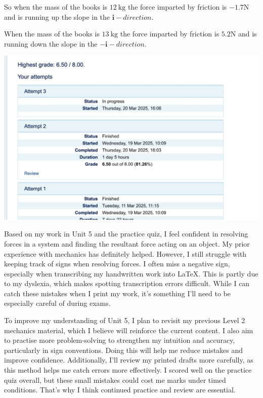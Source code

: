\documentclass{tufte-handout}
\begin{document}
\begin{question}
So when the mass of the books is \( \SI{12}{\kilo\gram} \) the force imparted by friction is 
\( -1.7\si{\newton} \) and is running up the slope in the \( \mathbf{i}-direction \).

When the mass of the books is \( \SI{13}{\kilo\gram} \) the force imparted by friction is
\( 5.2\si{\newton} \) and is running down the slope in the \( -\mathbf{i}-direction \).

\end{question}


\begin{question}

\qpart

\includegraphics[scale=0.6]{question_7.jpg}

\qpart

Based on my work in Unit 5 and the practice quiz, I feel confident in resolving forces in a system 
and finding the resultant force acting on an object. My prior experience with mechanics has definitely 
helped. However, I still struggle with keeping track of signs when resolving forces. I often miss 
a negative sign, especially when transcribing my handwritten work into \LaTeX{}. This is partly due to my 
dyslexia, which makes spotting transcription errors difficult. While I can catch these mistakes when 
I print my work, it’s something I’ll need to be especially careful of during exams.

\vspace{3cm}

\qpart

To improve my understanding of Unit 5, I plan to revisit my previous Level 2 mechanics material, 
which I believe will reinforce the current content. I also aim to practise more problem-solving 
to strengthen my intuition and accuracy, particularly in sign conventions. Doing this will help 
me reduce mistakes and improve confidence. Additionally, I’ll review my printed drafts more 
carefully, as this method helps me catch errors more effectively. I scored well on the practice 
quiz overall, but these small mistakes could cost me marks under timed conditions. That’s why 
I think continued practice and review are essential.

\end{question}
\end{document}

